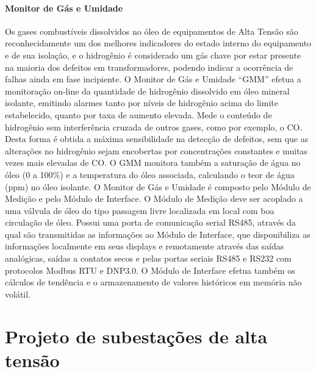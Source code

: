 \documentclass[a5paper,english,spanish,brazil]{ufsc-thesis}
\begin{document}
\subsubsection{Monitor de Gás e Umidade}
Os gases combustíveis dissolvidos no óleo de equipamentos de Alta Tensão são reconhecidamente um dos melhores indicadores do estado interno do equipamento e de sua isolação, e o hidrogênio é considerado um gás chave por estar presente na maioria dos defeitos em transformadores, podendo indicar a ocorrência de falhas ainda em fase incipiente. O Monitor de Gás e Umidade “GMM” efetua a monitoração on-line da quantidade de hidrogênio dissolvido em óleo mineral isolante, emitindo alarmes tanto por níveis de hidrogênio acima do limite estabelecido, quanto por taxa de aumento elevada. Mede o conteúdo de hidrogênio sem interferência cruzada de outros gases, como por exemplo, o CO. Desta forma é obtida a máxima sensibilidade na detecção de defeitos, sem que as alterações no hidrogênio sejam encobertas por concentrações constantes e muitas vezes mais elevadas de CO. O GMM monitora também a saturação de água no óleo (0 a 100\%) e a temperatura do óleo associada, calculando o teor de água (ppm) no óleo isolante. O Monitor de Gás e Umidade é composto pelo Módulo de Medição e pelo Módulo de Interface. O Módulo de Medição deve ser acoplado a uma válvula de óleo do tipo passagem livre localizada em local com boa circulação de óleo. Possui uma porta de comunicação serial RS485, através da qual são transmitidas as informações ao Módulo de Interface, que disponibiliza as informações localmente em seus displays e remotamente através das saídas analógicas, saídas a contatos secos e pelas portas seriais RS485 e RS232 com protocolos Modbus RTU e DNP3.0. O Módulo de Interface efetua também os cálculos de tendência e o armazenamento de valores históricos em memória não volátil.






\chapter{Projeto de subestações de alta tensão}
\label{chap:projSEAT}
\lipsum

\end{document}

